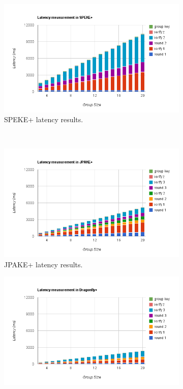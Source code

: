 \begin{figure}[h]
    \centering
    \begin{subfigure}[b]{0.5\textwidth}
        \centering
        \includegraphics[width=\textwidth]{benchmark/speke.png}
        \caption{SPEKE+ latency results.}
        \label{fig:speke_results}
    \end{subfigure}
    ~
    \begin{subfigure}[b]{0.5\textwidth}
        \centering
        \includegraphics[width=\textwidth]{benchmark/scale_jpake.png}
        \caption{JPAKE+ latency results.}
        \label{fig:jpake_results}
    \end{subfigure}
    \begin{subfigure}[b]{0.5\textwidth}
        \centering
        \includegraphics[width=\textwidth]{benchmark/scale_dragon.png}

\end{subfigure}
\end{figure}
